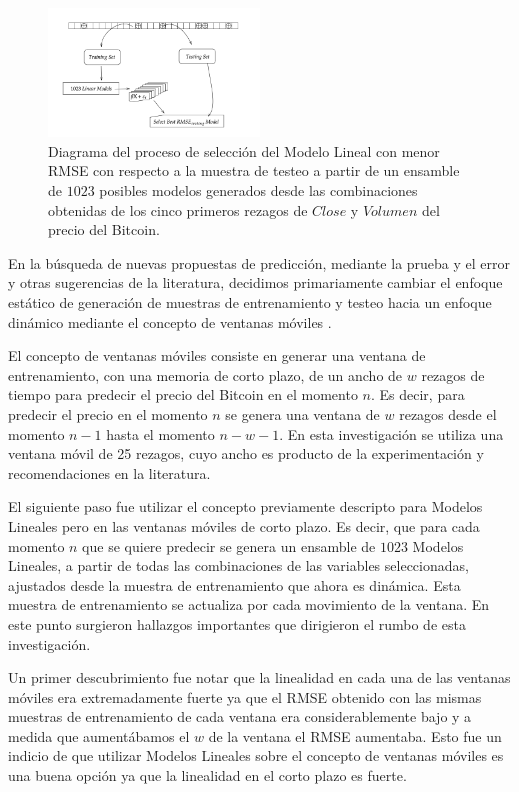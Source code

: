 \documentclass[a4paper,12pt,twocolumn]{article}
\begin{document}
\begin{figure}[!hbt]
\centering
\includegraphics[width=0.5\textwidth]{diagramLinearRegression}
\caption{Diagrama del proceso de selección del Modelo Lineal con menor RMSE con respecto a la muestra de testeo a partir de un ensamble de $1023$ posibles modelos generados desde las combinaciones obtenidas de los cinco primeros rezagos de $Close$ y $Volumen$ del precio del Bitcoin.}
\label{diagramLinearRegression}
\end{figure}

En la búsqueda de nuevas propuestas de predicción, mediante la prueba y el error y otras sugerencias de la literatura, decidimos primariamente cambiar el enfoque estático de generación de muestras de entrenamiento y testeo hacia un enfoque dinámico mediante el concepto de ventanas móviles \cite{forecastinBitcoinClosing}. 

El concepto de ventanas móviles consiste en generar una ventana de entrenamiento, con una memoria de corto plazo, de un ancho de $w$ rezagos de tiempo para predecir el precio del Bitcoin en el momento $n$. Es decir, para predecir el precio en el momento $n$ se genera una ventana de $w$ rezagos  desde el momento $n-1$ hasta el momento $n-w-1$. En esta investigación se utiliza una ventana móvil de 25 rezagos, cuyo ancho es producto de la experimentación y recomendaciones en la literatura. 

El siguiente paso fue utilizar el concepto previamente descripto para Modelos Lineales pero en las ventanas móviles de corto plazo. Es decir, que para cada momento $n$ que se quiere predecir se genera un ensamble de $1023$ Modelos Lineales, a partir de todas las combinaciones de las variables seleccionadas, ajustados desde la muestra de entrenamiento que ahora es dinámica. Esta muestra de entrenamiento se actualiza por cada movimiento de la ventana. En este punto surgieron hallazgos importantes que dirigieron el rumbo de esta investigación. 

Un primer descubrimiento fue notar que la linealidad en cada una de las ventanas móviles era extremadamente fuerte ya que el RMSE obtenido con las mismas muestras de entrenamiento de cada ventana era considerablemente bajo y a medida que aumentábamos el $w$ de la ventana el RMSE aumentaba. Esto fue un indicio de que utilizar Modelos Lineales sobre el concepto de ventanas móviles es una buena opción ya que la linealidad en el corto plazo es fuerte.
\end{document}
